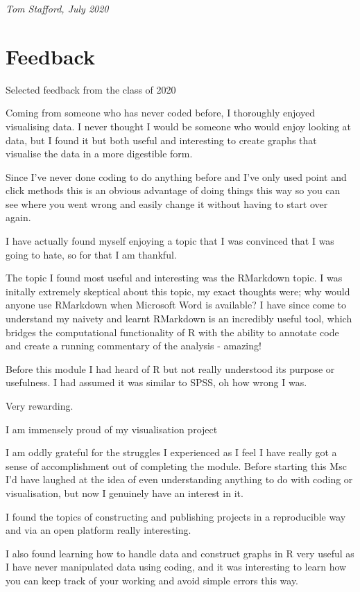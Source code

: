 \documentclass[
  12pt,
  a5paper,
]{book}
\begin{document}
\emph{Tom Stafford, July 2020}

\hypertarget{feedback}{%
\section{Feedback}\label{feedback}}

Selected feedback from the class of 2020

Coming from someone who has never coded before, I thoroughly enjoyed visualising data. I never thought I would be someone who would enjoy looking at data, but I found it but both useful and interesting to create graphs that visualise the data in a more digestible form.

Since I've never done coding to do anything before and I've only used point and click methods this is an obvious advantage of doing things this way so you can see where you went wrong and easily change it without having to start over again.

I have actually found myself enjoying a topic that I was convinced that I was going to hate, so for that I am thankful.

The topic I found most useful and interesting was the RMarkdown topic. I was initally extremely skeptical about this topic, my exact thoughts were; why would anyone use RMarkdown when Microsoft Word is available? I have since come to understand my naivety and learnt RMarkdown is an incredibly useful tool, which bridges the computational functionality of R with the ability to annotate code and create a running commentary of the analysis - amazing!

Before this module I had heard of R but not really understood its purpose or usefulness. I had assumed it was similar to SPSS, oh how wrong I was.

Very rewarding.

I am immensely proud of my visualisation project

I am oddly grateful for the struggles I experienced as I feel I have really got a sense of accomplishment out of completing the module. Before starting this Msc I'd have laughed at the idea of even understanding anything to do with coding or visualisation, but now I genuinely have an interest in it.

I found the topics of constructing and publishing projects in a reproducible way and via an open platform really interesting.

I also found learning how to handle data and construct graphs in R very useful as I have never manipulated data using coding, and it was interesting to learn how you can keep track of your working and avoid simple errors this way.
\end{document}
